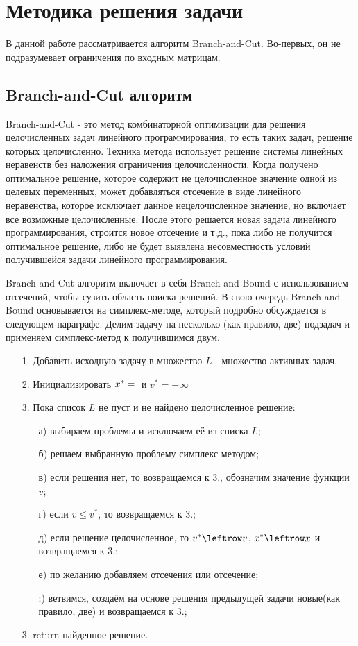 \documentclass[a4paper,14pt,russian]{extreport}
\begin{document}
\chapter{Методика решения задачи}
В данной работе рассматривается алгоритм Branch-and-Cut. Во-первых, он не подразумевает ограничения по входным матрицам. 
\section{Branch-and-Cut алгоритм}
Branch-and-Cut - это метод комбинаторной оптимизации для решения целочисленных задач линейного программирования, то есть таких задач, решение которых целочисленно. Техника метода использует решение системы линейных неравенств без наложения ограничения целочисленности. Когда получено оптимальное решение, которое содержит не целочисленное значение одной из целевых переменных, может добавляться отсечение в виде линейного неравенства, которое исключает данное нецелочисленное значение, но включает все возможные целочисленные. После этого решается новая задача линейного программирования, строится новое отсечение и т.д., пока либо не получится оптимальное решение, либо не будет выявлена несовместность условий получившейся задачи линейного программирования. 
\par
Branch-and-Cut алгоритм включает в себя Branch-and-Bound с использованием отсечений, чтобы сузить область поиска решений. В свою очередь Branch-and-Bound основывается на симплекс-методе, который подробно обсуждается в следующем параграфе. Делим задачу на несколько (как правило, две) подзадач и применяем симплекс-метод к получившимся двум.

\begin{enumerate}
\item[1.]
Добавить исходную задачу в множество $L$ - множество активных задач.
\item[2.]
Инициализировать $x^* = \null$ и $v^* = -\infty$
\item[3.]
Пока список $L$ не пуст и не найдено целочисленное решение:
\begin{enumerate}
\item[а)] выбираем проблемы и исключаем её из списка $L$;
\item[б)] решаем выбранную проблему симплекс методом;
\item[в)] если решения нет, то возвращаемся к 3., обозначим значение функции $v$; 
\item[г)] если  $v \le v^*$, то возвращаемся к 3.;
\item[д)] если решение целочисленное, то $v^* \leftrow v$, $x^* \leftrow x$ и возвращаемся к 3.;
\item[е)] по желанию добавляем отсечения или отсечение;
\item[;)] ветвимся, создаём на основе решения предыдущей задачи новые(как правило, две) и возвращаемся к 3.;
\end{enumerate}
\item[3.] return найденное решение.
\end{enumerate}
 
\end{document}
